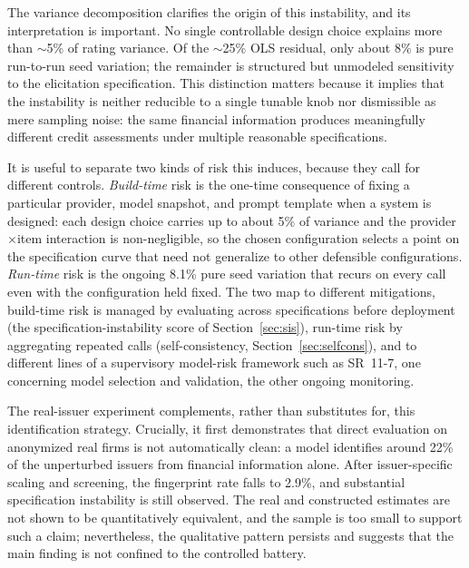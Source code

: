 \documentclass[a4paper,fleqn]{cas-sc}
\begin{document}
The variance decomposition clarifies the origin of this instability, and its interpretation is important.
No single controllable design choice explains more than $\sim$5\% of rating variance. Of the $\sim$25\%
OLS residual, only about 8\% is pure run-to-run seed variation; the remainder is structured but unmodeled
sensitivity to the elicitation specification. This distinction matters because it implies that the
instability is neither reducible to a single tunable knob nor dismissible as mere sampling noise: the
same financial information produces meaningfully different credit assessments under multiple reasonable
specifications.

It is useful to separate two kinds of risk this induces, because they call for different controls.
\emph{Build-time} risk is the one-time consequence of fixing a particular provider, model snapshot, and
prompt template when a system is designed: each design choice carries up to about 5\% of variance and the
provider$\times$item interaction is non-negligible, so the chosen configuration selects a point on the
specification curve that need not generalize to other defensible configurations. \emph{Run-time} risk is
the ongoing 8.1\% pure seed variation that recurs on every call even with the configuration held fixed.
The two map to different mitigations, build-time risk is managed by evaluating across specifications
before deployment (the specification-instability score of Section~\ref{sec:sis}), run-time risk by
aggregating repeated calls (self-consistency, Section~\ref{sec:selfcons}), and to different lines of a
supervisory model-risk framework such as SR~11-7, one concerning model selection and validation, the
other ongoing monitoring.

The real-issuer experiment complements, rather than substitutes for, this identification strategy.
Crucially, it first demonstrates that direct evaluation on anonymized real firms is not automatically
clean: a model identifies around 22\% of the unperturbed issuers from financial information alone. After
issuer-specific scaling and screening, the fingerprint rate falls to 2.9\%, and substantial
specification instability is still observed. The real and constructed estimates are not shown to be
quantitatively equivalent, and the sample is too small to support such a claim; nevertheless, the
qualitative pattern persists and suggests that the main finding is not confined to the controlled battery.
\end{document}
